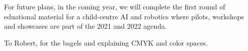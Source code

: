 \documentclass[sigconf]{acmart}
\begin{document}
For future plans, in the coming year, we will complete the first round of eduational material for a child-centre AI and robotics where pilots, workshops and showcases are part of the 2021 and 2022 agenda.  


\begin{acks}
To Robert, for the bagels and explaining CMYK and color spaces.
\end{acks}



\end{document}

